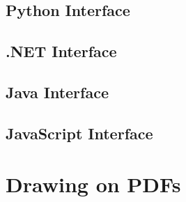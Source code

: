 \documentclass{book}
\begin{document}
\begin{pycpdflib}
\clearpage
\section*{Python Interface}
\begin{small}\tt

\end{small}
\end{pycpdflib}

\begin{dotnetcpdflib}
\clearpage
\section*{.NET Interface}
\begin{small}\tt

\end{small}
\end{dotnetcpdflib}

\begin{jcpdflib}
\clearpage
\section*{Java Interface}
\begin{small}\tt

\end{small}
\end{jcpdflib}

\begin{jscpdflib}
\clearpage
\section*{JavaScript Interface}
\begin{small}\tt

\end{small}
\end{jscpdflib}

\clearpage\pagestyle{empty}
\chapter{Drawing on PDFs}\label{chap:18}\pagestyle{fancy}
\end{document}
